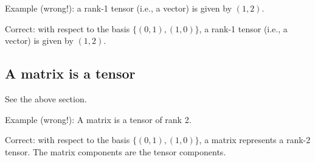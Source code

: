 Example (wrong!): a rank-1 tensor (i.e., a vector) is given by
$(1,2)$.

Correct: with respect to the basis $\{(0,1),(1,0)\}$,  a rank-1 tensor (i.e., a vector) is given by
$(1,2)$.


\subsection{A matrix is a tensor}

See the above section.

Example (wrong!): A matrix is  a  tensor of rank 2.

Correct: with respect to the basis $\{(0,1),(1,0)\}$,  a matrix represents a rank-2 tensor.
The matrix components are the tensor components.



